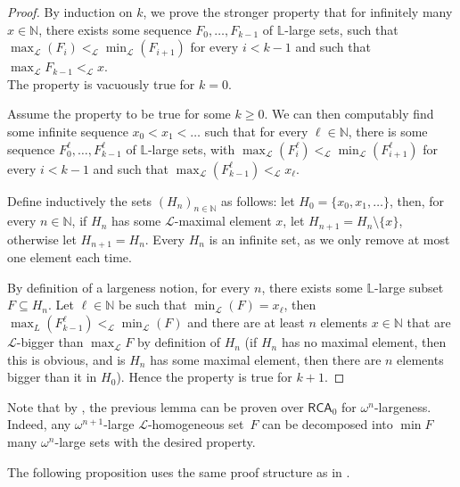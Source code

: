 \documentclass{article}
\numberwithin{theorem}{section}
\newtheorem{proposition}[theorem]{Proposition}
\def\LL{\mathbb{L}}
\def\L{\mathcal{L}}
\newcommand{\dbf}{\mathbf{d}}
\newcommand{\RCA}[0]{\mathsf{RCA}}
\newcommand{\NN}[0]{\mathbb{N}}
\begin{document}
\begin{proof}
By induction on $k$, we prove the stronger property that for infinitely many $x \in \NN$, there exists some sequence $F_0, \dots, F_{k-1}$ of $\LL$-large sets, such that $\max_\L(F_i) <_\L \min_\L(F_{i+1})$ for every $i < k-1$ and such that $\max_{\L} F_{k-1} <_\L x$. \\

The property is vacuously true for $k = 0$.

Assume the property to be true for some $k \geq 0$. We can then computably find some infinite sequence $x_0 < x_1 < \dots$ such that for every $\ell \in \NN$, there is some sequence $F_0^\ell, \dots, F_{k - 1}^\ell$ of $\LL$-large sets, with $\max_\L(F_i^\ell) <_\L \min_\L(F_{i+1}^\ell)$ for every $i < k-1$ and such that $\max_{\L}(F_{k - 1}^\ell) <_{\L} x_\ell$. 

Define inductively the sets $(H_n)_{n \in \NN}$ as follows: let $H_0 = \{x_0, x_1, \dots \}$, then, for every $n \in \NN$, if $H_n$ has some $\L$-maximal element $x$, let $H_{n+1} = H_n \setminus \{x\}$, otherwise let $H_{n+1} = H_n$. Every $H_n$ is an infinite set, as we only remove at most one element each time.

By definition of a largeness notion, for every $n$, there exists some $\LL$-large subset $F \subseteq H_n$. Let $\ell \in \NN$ be such that $\min_{\L}(F) = x_\ell$, then $\max_{L}(F_{k - 1}^\ell) <_\L \min_{\L}(F)$ and there are at least $n$ elements $x \in \NN$ that are $\L$-bigger than $\max_{\L} F$ by definition of $H_n$ (if $H_n$ has no maximal element, then this is obvious, and is $H_n$ has some maximal element, then there are $n$ elements bigger than it in $H_0$). Hence the property is true for $k+1$.
\end{proof}

Note that by , the previous lemma can be proven over $\RCA_0$ for $\omega^n$-largeness. Indeed, any $\omega^{n+1}$-large $\L$-homogeneous set~$F$ can be decomposed into $\min F$ many $\omega^n$-large sets with the desired property.

The following proposition uses the same proof structure as in .

\end{document}
